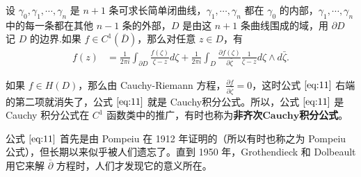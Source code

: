 \documentclass[../../main.tex]{subfiles}
\begin{document}
\begin{theorem}\label{theorem:非齐次Cauchy积分公式(Pompeiu公式)}
设 \( \gamma_0, \gamma_1, \cdots, \gamma_n \) 是 \( n + 1 \) 条可求长简单闭曲线，\( \gamma_1, \cdots, \gamma_n \) 都在 \( \gamma_0 \) 的内部，\( \gamma_1, \cdots, \gamma_n \) 中的每一条都在其他 \( n - 1 \) 条的外部，\( D \) 是由这 \( n + 1 \) 条曲线围成的域，用 \(\partial D \) 记 \( D \) 的边界.如果 \( f \in C^1(\bar{D}) \)，那么对任意 \( z \in D \)，有
\begin{align}
f(z) &= \frac{1}{2\pi i} \int_{\partial D} \frac{f(\zeta)}{\zeta - z} d\zeta + \frac{1}{2\pi i} \int_D \frac{\partial f(\zeta)}{\partial \bar{\zeta}} \frac{1}{\zeta - z} d\zeta \wedge d\bar{\zeta}. \label{eq:11}
\end{align}
\end{theorem}
\begin{note}
如果 \( f \in H(D) \)，那么由 Cauchy-Riemann 方程，\( \frac{\partial f}{\partial \bar{\zeta}} = 0 \)，这时公式 \(\eqref{eq:11}\) 右端的第二项就消失了，公式 \(\eqref{eq:11}\) 就是 Cauchy积分公式。所以，公式 \(\eqref{eq:11}\) 是 Cauchy 积分公式在 \( C^1 \) 函数类中的推广，有时也称为\textbf{非齐次}$\mathbf{Cauchy}$\textbf{积分公式}。

公式 \(\eqref{eq:11}\) 首先是由 Pompeiu 在 1912 年证明的（所以有时也称之为 Pompeiu 公式），但长期以来似乎被人们遗忘了。直到 1950 年，Grothendieck 和 Dolbeault 用它来解 \( \bar{\partial} \) 方程时，人们才发现它的意义所在。
\end{note}
\end{document}
